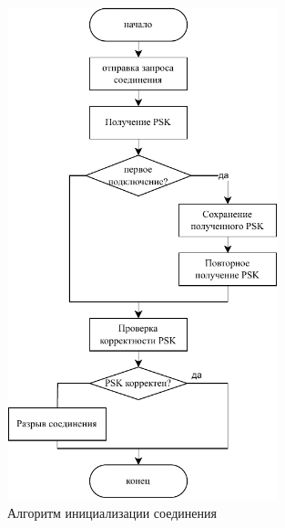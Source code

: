 \begin{figure}[h!]
    \centering
    \includegraphics[width=0.7\textwidth]{img/init}
    \caption{Алгоритм инициализации соединения}
    \label{fig:init}
\end{figure}
